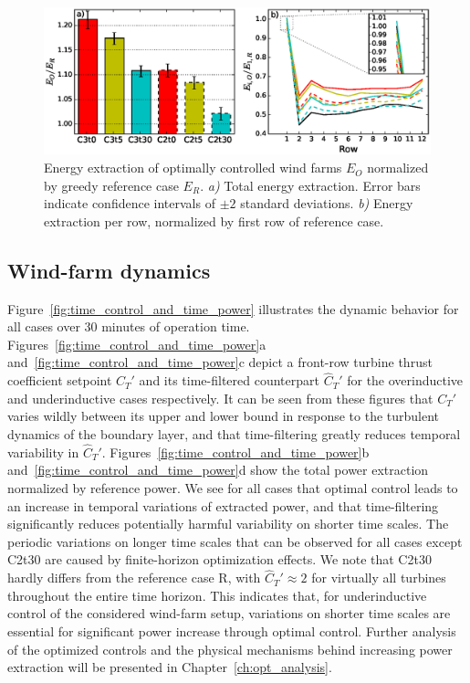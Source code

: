 \begin{figure}
	\centering
	\includegraphics[width=\linewidth]{chapters/philtrans_torque/figure8.eps}
	\caption[Energy extraction of optimally controlled wind farms $E_O$ normalized by greedy reference case $E_R$.]{Energy extraction of optimally controlled wind farms $E_O$ normalized by greedy reference case $E_R$. \emph{a) } Total energy extraction. Error bars indicate confidence intervals of $\pm 2$ standard deviations. \emph{b) } Energy extraction per row, normalized by first row of reference case. \legend \label{fig:bar_and_row}}
\end{figure}

\subsection{Wind-farm dynamics}\label{sec:opt_ind_dyn}
Figure~\ref{fig:time_control_and_time_power} illustrates the dynamic behavior for all cases over 30 minutes of operation time. Figures~\ref{fig:time_control_and_time_power}a and~\ref{fig:time_control_and_time_power}c depict a front-row turbine thrust coefficient setpoint $C_T'$ and its time-filtered counterpart $\widehat{C}_T'$ for the overinductive and underinductive cases respectively. It can be seen from these figures that $C_T'$ varies wildly between its upper and lower bound in response to the turbulent dynamics of the boundary layer, and that time-filtering greatly reduces temporal variability in $\widehat{C}_T'$. Figures~\ref{fig:time_control_and_time_power}b and~\ref{fig:time_control_and_time_power}d show the total power extraction normalized by reference power. We see for all cases that optimal control leads to an increase in temporal variations of extracted power, and that time-filtering significantly reduces potentially harmful variability on shorter time scales. The periodic variations on longer time scales that can be observed for all cases except C2t30 are caused by finite-horizon optimization effects.
We note that C2t30 hardly differs from the reference case R, with $\widehat{C}_T' \approx 2$ for virtually all turbines throughout the entire time horizon. This indicates that, for underinductive control of the considered wind-farm setup, variations on shorter time scales are essential for significant power increase through optimal control. Further analysis of the optimized controls and the physical mechanisms behind increasing power extraction will be presented in Chapter~\ref{ch:opt_analysis}. 

